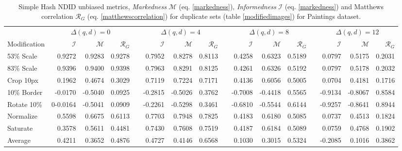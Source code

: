 \documentclass[english,12pt,a4paper,pdftex,elec,utf8, table]{aaltothesis}
\begin{document}
\begin{table}\footnotesize
\caption{ Simple Hash NDID unbiased metrics, \emph{Markedness} $\mathcal{M}$ (eq. \ref{markedness}), \emph{Informedness} $\mathcal{I}$ (eq. \ref{markedness}) and Matthews correlation $\mathcal{R}_G$ (eq. \ref{matthewscorrelation}) for duplicate sets (table \ref{modifiedimages}) for Paintings dataset. }
\label{simpleunbiased}
\begin{center}
  \setlength\tabcolsep{3pt} %
  \begin{tabular}{@{}lrrrrrrrrrrrrrrr@{}}
    \toprule
    & \multicolumn{3}{c}{$\Delta(q,d) = 0$} &\phantom{abc} &\multicolumn{3}{c}{$\Delta(q,d) = 4$} &\phantom{abc} & \multicolumn{3}{c}{$\Delta(q,d)=8$} &\phantom{abc} & \multicolumn{3}{c}{$\Delta(q,d)=12$}\\
\cmidrule{2-4} \cmidrule{6-8} \cmidrule{10-12} \cmidrule{14-16}
    Modification & $\mathcal{I}$ & $\mathcal{M}$ & $\mathcal{R}_G$ &\phantom{abc} & $\mathcal{I}$ & $\mathcal{M}$ & $\mathcal{R}_G$ &\phantom{abc} & $\mathcal{I}$ & $\mathcal{M}$ & $\mathcal{R}_G$ &\phantom{abc} & $\mathcal{I}$ & $\mathcal{M}$ & $\mathcal{R}_G$\\ \midrule
    53\% Scale   & 0.9272 & 0.9283& 0.9278  &\phantom{abc} & 0.7952 & 0.8278 & 0.8113 &\phantom{abc} & 0.4258 & 0.6323 & 0.5189 &\phantom{abc} & 0.0797 & 0.5175 & 0.2031\\
    83\% Scale   & 0.9396 & 0.9400 & 0.9398 &\phantom{abc} & 0.7963 & 0.8291 & 0.8125 &\phantom{abc} & 0.4261 & 0.6326 & 0.5192 &\phantom{abc} & 0.0797 & 0.5178 & 0.2032 \\
    Crop 10px    & 0.1962  & 0.4674  & 0.3029 &\phantom{abc} & 0.7119 & 0.7224 & 0.7171 &\phantom{abc} & 0.4136 & 0.6056 & 0.5005 &\phantom{abc} & 0.0704 & 0.4181 & 0.1716\\
    10\% Border  & -0.0170 & -0.5040 & 0.0925 & \phantom{abc} & -0.2815 & -0.5026 & 0.3762&\phantom{abc} & -0.7008 & -0.4418& 0.5565 &\phantom{abc} & -0.9134 & -0.8067 & 0.8584\\
    Rotate 10\%  & 0-0.0164 &  -0.5041&  0.0909 &\phantom{abc} & -0.2261 & -0.5298 & 0.3461 &\phantom{abc} & -0.6810& -0.5544 & 0.6144 &\phantom{abc} & -0.9257& -0.8641& 0.8944\\
    Normalize    & 0.5598 & 0.6675 & 0.6113 &\phantom{abc} &  0.7703 & 0.7948 & 0.7825 &\phantom{abc} & 0.4183 & 0.6180 & 0.5085 &\phantom{abc} & 0.0737 & 0.4513 & 0.1824\\
    Saturate     & 0.3578 & 0.5611 &  0.4481 &\phantom{abc} & 0.7430  & 0.7608 & 0.7519&\phantom{abc} & 0.4187 & 0.6184 & 0.5089 &\phantom{abc} & 0.0759& 0.4768 & 0.1902\\
    \bottomrule
    Average      & 0.4211 & 0.3652 & 0.4876 & \phantom{abc} & \cellcolor{blue!25}0.4727 & 0.4146 & 0.6568 & \phantom{abc} & 0.1030 & 0.3015 & 0.5324 &\phantom{abc} & -0.2085 & 0.1016 & 0.3862\\
\end{tabular}
\end{center}
\end{table}
\end{document}
